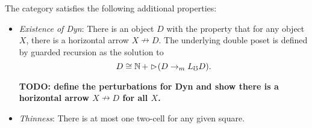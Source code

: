 The category satisfies the following additional properties:
\begin{itemize}
    \item \emph{Existence of Dyn}: There is an object $D$ with the property that for any
    object $X$, there is a horizontal arrow $X \nrightarrow D$.
    The underlying double poset is defined by guarded recursion as the solution to
    \[ D \cong \mathbb{N}\, + \vartriangleright \hspace{-0.5ex} (D \to_m L_\mho D). \]

    \textbf{TODO: define the perturbations for Dyn and show there is a horizontal arrow $X \nrightarrow D$ for all $X$.}
    
    \item \emph{Thinness}: There is at most one two-cell for any given square.




\end{itemize}


